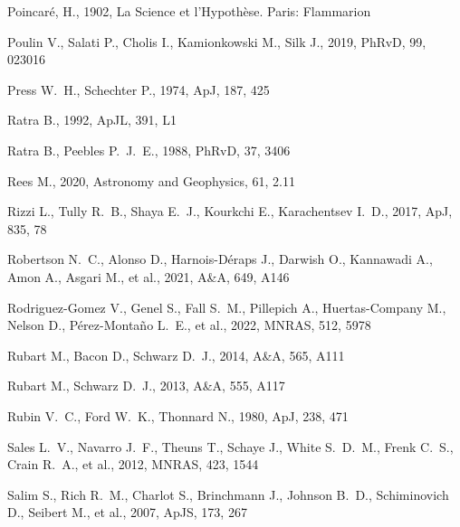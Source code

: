 \documentclass[fleqn,12pt]{article}
\begin{document}
\begin{thebibliography}{}
 Poincar\'e, H., 1902, La Science et l'Hypoth\`ese. Paris: Flammarion

 Poulin V., Salati P., Cholis I., Kamionkowski M., Silk J., 2019, PhRvD, 99, 023016

 Press W.~H., Schechter P., 1974, ApJ, 187, 425

 Ratra B., 1992, ApJL, 391, L1

 Ratra B., Peebles P.~J.~E., 1988, PhRvD, 37, 3406

 Rees M., 2020, Astronomy and Geophysics, 61, 2.11

 Rizzi L., Tully R.~B., Shaya E.~J., Kourkchi E., Karachentsev I.~D., 2017, ApJ, 835, 78

 Robertson N.~C., Alonso D., Harnois-D{\'e}raps J., Darwish O., Kannawadi A., Amon A., Asgari M., et al., 2021, A\&A, 649, A146

 Rodriguez-Gomez V., Genel S., Fall S.~M., Pillepich A., Huertas-Company M., Nelson D., P{\'e}rez-Monta{\~n}o L.~E., et al., 2022, MNRAS, 512, 5978

 Rubart M., Bacon D., Schwarz D.~J., 2014, A\&A, 565, A111

 Rubart M., Schwarz D.~J., 2013, A\&A, 555, A117

 Rubin V.~C., Ford W.~K., Thonnard N., 1980, ApJ, 238, 471

 Sales L.~V., Navarro J.~F., Theuns T., Schaye J., White S.~D.~M., Frenk C.~S., Crain R.~A., et al., 2012, MNRAS, 423, 1544

 Salim S., Rich R.~M., Charlot S., Brinchmann J., Johnson B.~D., Schiminovich D., Seibert M., et al., 2007, ApJS, 173, 267


\end{thebibliography}
\end{document}
